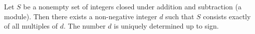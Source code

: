 Let $S$ be a nonempty set of integers closed under addition and subtraction (a module). Then there exists a non-negative integer $d$ such that $S$ consists exactly of all multiples of $d$. The number $d$ is uniquely determined up to sign.
